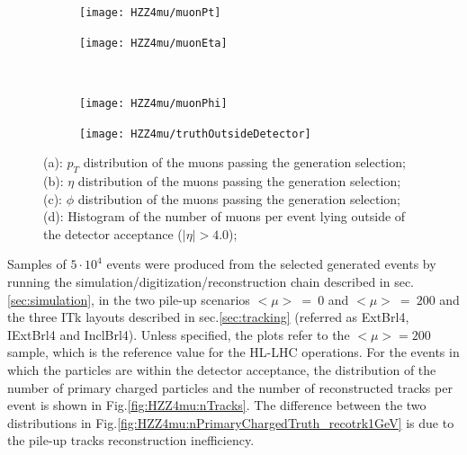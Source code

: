 \documentclass[a4paper,twoside,12pt]{article}
\begin{document}
\begin{figure}
\begin{subfigure}{.5\linewidth}
\texttt{[image: HZZ4mu/muonPt]}
\caption{}
\label{fig:HZZ4mu:pt}
\end{subfigure}
\begin{subfigure}{.5\linewidth}
\centering
\texttt{[image: HZZ4mu/muonEta]}
\caption{}
\label{fig:HZZ4mu:eta}
\end{subfigure}\\[1 ex]
\begin{subfigure}{.5\linewidth}
\centering
\texttt{[image: HZZ4mu/muonPhi]}
\caption{}
\label{fig:HZZ4mu:phi}
\end{subfigure}
\begin{subfigure}{.5\linewidth}
\centering
\texttt{[image: HZZ4mu/truthOutsideDetector]}
\caption{}
\label{fig:HZZ4mu:truthOutsideDetector}
\end{subfigure}
\caption{(a): $p_T$ distribution of the muons passing the generation selection;\\
	        (b): $\eta$ distribution of the muons passing the generation selection;\\
        	        (c): $\phi$ distribution of the muons passing the generation selection;\\
         	        (d): Histogram of the number of muons per event lying outside of the detector acceptance
         	        	($|\eta| > 4.0$);\\
        	        }
\label{fig:HZZ4mu:muonKinematics}
\end{figure}

Samples of $5 \cdot 10^4$ events were produced from the selected generated events by running
the simulation/digitization/reconstruction chain described in sec.\ref{sec:simulation}, in the
two pile-up scenarios  $<\mu>\ =\ 0$ and $<\mu>\ =\ 200$ and the three ITk layouts described in sec.\ref{sec:tracking} 
(referred as ExtBrl4, IExtBrl4 and InclBrl4). Unless specified, the plots refer to the $<\mu> = 200$ sample, which is the reference
value for the HL-LHC operations. For the events in which the particles are within the detector acceptance, the distribution of
the number of primary charged particles and the number of reconstructed tracks per event is shown in
Fig.\ref{fig:HZZ4mu:nTracks}. The difference between the two distributions in Fig.\ref{fig:HZZ4mu:nPrimaryChargedTruth_recotrk1GeV} is
due to the pile-up tracks reconstruction inefficiency.
\end{document}
